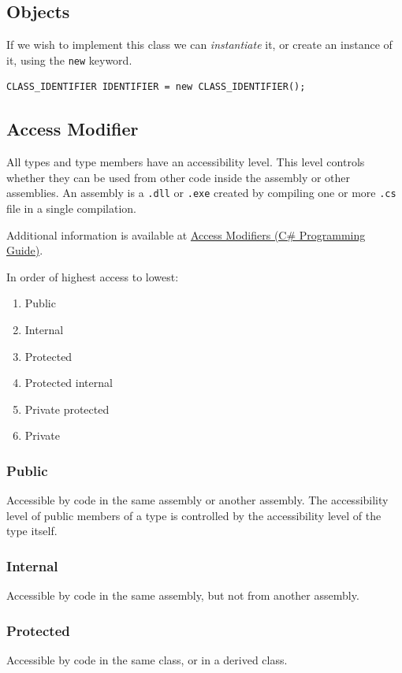 \documentclass{article}
\begin{document}
\subsection{Objects}
If we wish to implement this class we can \textit{instantiate} it,
or create an instance of it, using the \lstinline{new} keyword.
\begin{lstlisting}[numbers=none]
CLASS_IDENTIFIER IDENTIFIER = new CLASS_IDENTIFIER();
\end{lstlisting}
\subsection{Access Modifier}
All types and type members have an accessibility level. This level controls whether they can
be used from other code inside the assembly or other assemblies. An assembly is a \lstinline{.dll}
or \lstinline{.exe} created by compiling one or more \lstinline{.cs} file in a single compilation.

Additional information is available at \href{https://docs.microsoft.com/en-us/dotnet/csharp/programming-guide/classes-and-structs/access-modifiers}{Access Modifiers (C\# Programming Guide)}.

In order of highest access to lowest:
\begin{enumerate}
    \item Public
    \item Internal
    \item Protected
    \item Protected internal
    \item Private protected
    \item Private
\end{enumerate}
\subsubsection{Public}
Accessible by code in the same assembly or another assembly.
The accessibility level of public members of a type is controlled by the accessibility level of the type itself.
\subsubsection{Internal}
Accessible by code in the same assembly, but not from another assembly.
\subsubsection{Protected}
Accessible by code in the same class, or in a derived class.
\end{document}
